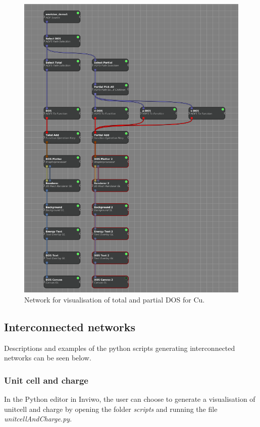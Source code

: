 \documentclass[a4paper,12pt]{article}
\begin{document}
\begin{figure}[H]
    \centering
    \includegraphics[scale=0.4]{screenshot_dos_network_Cu_1_10.png}
    \caption{Network for visualisation of total and partial DOS for Cu.}
    \label{fig:network_dos}
\end{figure}

\subsection{Interconnected networks}
Descriptions and examples of the python scripts generating interconnected networks can be seen below.

\subsubsection{Unit cell and charge}
In the Python editor in Inviwo, the user can choose to generate a visualisation of unitcell and charge by opening the folder \textit{scripts} and running the file \textit{unitcellAndCharge.py}.
\end{document}
